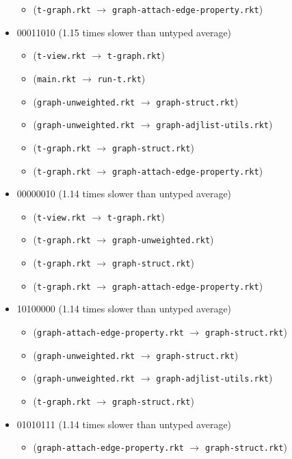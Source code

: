 \documentclass{article}
\newcommand{\mono}[1]{\texttt{#1}}
\begin{document}
\begin{itemize}
\begin{itemize}
  \item (\mono{t-graph.rkt} $\rightarrow$ \mono{graph-attach-edge-property.rkt})
  \end{itemize}
\item 00011010 (1.15 times slower than untyped average)
  \begin{itemize}
  \item (\mono{t-view.rkt} $\rightarrow$ \mono{t-graph.rkt})
  \item (\mono{main.rkt} $\rightarrow$ \mono{run-t.rkt})
  \item (\mono{graph-unweighted.rkt} $\rightarrow$ \mono{graph-struct.rkt})
  \item (\mono{graph-unweighted.rkt} $\rightarrow$ \mono{graph-adjlist-utils.rkt})
  \item (\mono{t-graph.rkt} $\rightarrow$ \mono{graph-struct.rkt})
  \item (\mono{t-graph.rkt} $\rightarrow$ \mono{graph-attach-edge-property.rkt})
  \end{itemize}
\item 00000010 (1.14 times slower than untyped average)
  \begin{itemize}
  \item (\mono{t-view.rkt} $\rightarrow$ \mono{t-graph.rkt})
  \item (\mono{t-graph.rkt} $\rightarrow$ \mono{graph-unweighted.rkt})
  \item (\mono{t-graph.rkt} $\rightarrow$ \mono{graph-struct.rkt})
  \item (\mono{t-graph.rkt} $\rightarrow$ \mono{graph-attach-edge-property.rkt})
  \end{itemize}
\item 10100000 (1.14 times slower than untyped average)
  \begin{itemize}
  \item (\mono{graph-attach-edge-property.rkt} $\rightarrow$ \mono{graph-struct.rkt})
  \item (\mono{graph-unweighted.rkt} $\rightarrow$ \mono{graph-struct.rkt})
  \item (\mono{graph-unweighted.rkt} $\rightarrow$ \mono{graph-adjlist-utils.rkt})
  \item (\mono{t-graph.rkt} $\rightarrow$ \mono{graph-struct.rkt})
  \end{itemize}
\item 01010111 (1.14 times slower than untyped average)
  \begin{itemize}
  \item (\mono{graph-attach-edge-property.rkt} $\rightarrow$ \mono{graph-struct.rkt})

\end{itemize}
\end{itemize}
\end{document}
